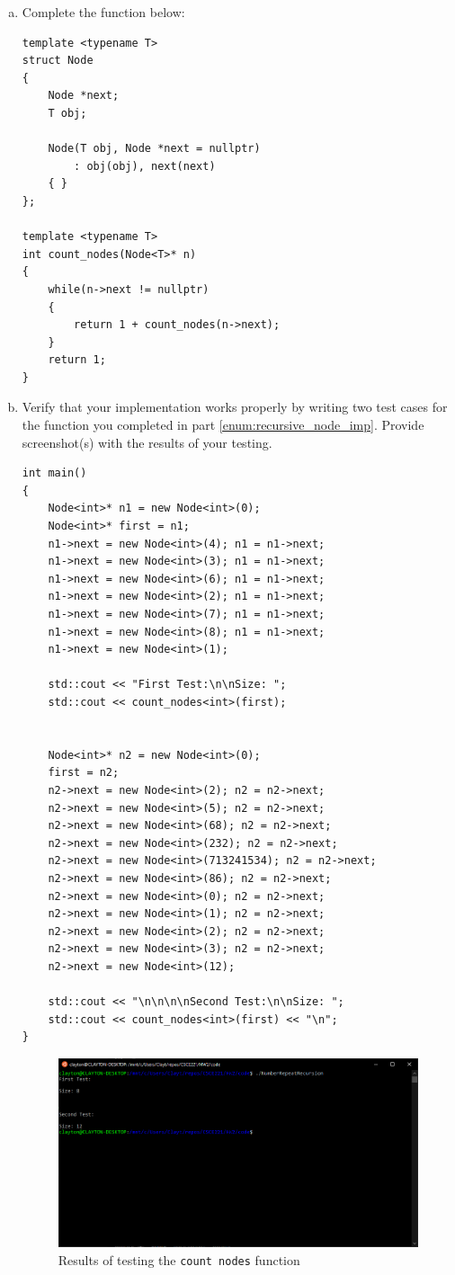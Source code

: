\documentclass[english]{article}
\newcommand*{\code}[1]{\texttt{#1}}
\begin{document}
\begin{enumerate}[(a)]
  \item Complete the function below:
  \label{enum:recursive_node_imp}

\begin{lstlisting}
template <typename T>
struct Node
{
    Node *next;
    T obj;

    Node(T obj, Node *next = nullptr)
        : obj(obj), next(next)
    { }
};

template <typename T>
int count_nodes(Node<T>* n)
{
    while(n->next != nullptr)
    {
        return 1 + count_nodes(n->next);
    }
    return 1;
}
\end{lstlisting}

  \item Verify that your implementation works properly by writing two test cases for the function you completed in part \ref{enum:recursive_node_imp}. Provide screenshot(s) with the results of your testing.

\begin{lstlisting}
int main()
{
    Node<int>* n1 = new Node<int>(0);
    Node<int>* first = n1;
    n1->next = new Node<int>(4); n1 = n1->next;
    n1->next = new Node<int>(3); n1 = n1->next;
    n1->next = new Node<int>(6); n1 = n1->next;
    n1->next = new Node<int>(2); n1 = n1->next;
    n1->next = new Node<int>(7); n1 = n1->next;
    n1->next = new Node<int>(8); n1 = n1->next;
    n1->next = new Node<int>(1);

    std::cout << "First Test:\n\nSize: ";
    std::cout << count_nodes<int>(first);


    Node<int>* n2 = new Node<int>(0);
    first = n2;
    n2->next = new Node<int>(2); n2 = n2->next;
    n2->next = new Node<int>(5); n2 = n2->next;
    n2->next = new Node<int>(68); n2 = n2->next;
    n2->next = new Node<int>(232); n2 = n2->next;
    n2->next = new Node<int>(713241534); n2 = n2->next;
    n2->next = new Node<int>(86); n2 = n2->next;
    n2->next = new Node<int>(0); n2 = n2->next;
    n2->next = new Node<int>(1); n2 = n2->next;
    n2->next = new Node<int>(2); n2 = n2->next;
    n2->next = new Node<int>(3); n2 = n2->next;
    n2->next = new Node<int>(12);

    std::cout << "\n\n\n\nSecond Test:\n\nSize: ";
    std::cout << count_nodes<int>(first) << "\n";
}
\end{lstlisting}

\begin{figure}[H]
    \centering
    \includegraphics[width=0.8\linewidth]{2-tests.png}
    \caption{Results of testing the \code{count nodes} function}
    \label{fig:intersection_tests}
 \end{figure}  


\end{enumerate}
\end{document}
